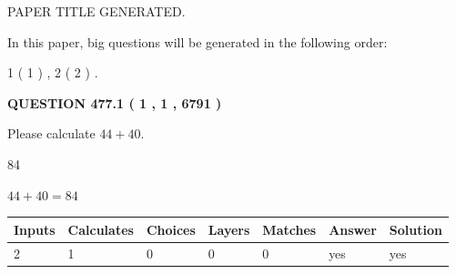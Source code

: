 \documentclass[12pt]{article}
\begin{document}
   
\vspace{0.2in}
   
   
   
   
   
   
   
   
 \vspace{0.2in}
 
 
 
 
   
   
 PAPER TITLE GENERATED.
   
   
   
\vspace{0.2in}
   
In this paper, big questions will be generated in the following order: 
   
   
   1 ( 1 )
 ,
   2 ( 2 )
 .
  
\vspace{0.2in}
  
{\textbf{\Large{QUESTION
477.1 
 ( 1 , 1 , 6791 )
}}}
  
  
 
Please calculate $ %
44 +  %
40 $.
 
 
 
\noindent{}
 
 

84
 
 
\noindent{}
 
 

 
 
 
\noindent{}
 
 

$ %
44 +  %
40=   %
84$
 
 
\noindent{}
 
 

 
   
   
   
   
\noindent\begin{tabular}{|l|l|l|l|l|l|l|}
 \hline
Inputs & Calculates & Choices & Layers & Matches & Answer & Solution \\ \hline
 2  & 
 1  & 
 0
  & 
 0  & 
 0  & 
  yes & 
  yes 
  \\ \hline
 \end{tabular}
   
\end{document}

